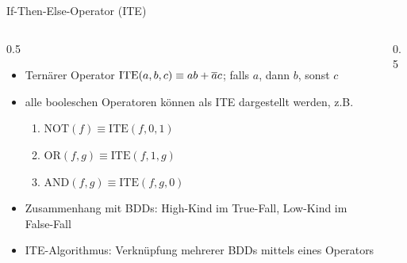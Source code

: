 \begin{frame}[c, fragile]{If-Then-Else-Operator (ITE)}
	\begin{columns}[c]
		\begin{column}{0.5\textwidth}
			\begin{itemize}
				\item Ternärer Operator $\textrm{ITE}(a, b, c)\equiv ab + \overline{a}c$; falls $a$, dann $b$, sonst $c$
				\item alle booleschen Operatoren können als ITE dargestellt werden, z.B.
				      \begin{enumerate}
					      \item $\textrm{NOT}(f) \equiv \textrm{ITE}(f, 0, 1)$
					      \item $\textrm{OR}(f,g) \equiv \textrm{ITE}(f, 1, g)$
					      \item $\textrm{AND}(f,g) \equiv \textrm{ITE}(f, g, 0)$
				      \end{enumerate}
				\item Zusammenhang mit BDDs: High-Kind im True-Fall, Low-Kind im False-Fall
				\item ITE-Algorithmus: Verknüpfung mehrerer BDDs mittels eines Operators
			\end{itemize}
		\end{column}
		\begin{column}{0.5\textwidth}
			\begin{center}
\end{center}
\end{column}
\end{columns}
\end{frame}
